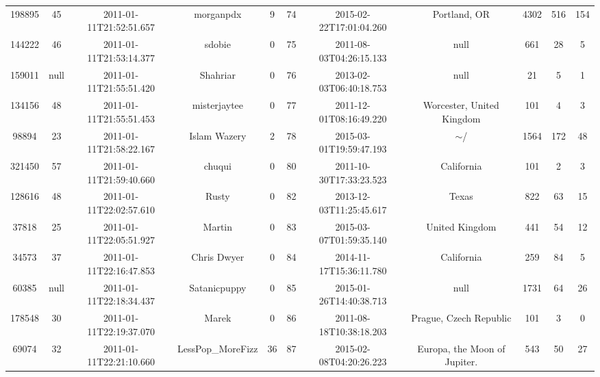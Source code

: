 \documentclass[12pt,a4paper,twoside,openright,titlepage,final]{article}
\begin{document}
\begin{landscape}
\begin{center}
\begin{longtable}{@{\extracolsep{\fill}}*{11}{c}}
			198895    & 45   & 2011-01-11T21:52:51.657 & morganpdx             & 9         & 74    & 2015-02-22T17:01:04.260 & Portland, OR                     & 4302       & 516     & 154   \\
			144222    & 46   & 2011-01-11T21:53:14.377 & sdobie                & 0         & 75    & 2011-08-03T04:26:15.133 & null                             & 661        & 28      & 5     \\
			159011    & null & 2011-01-11T21:55:51.420 & Shahriar              & 0         & 76    & 2013-02-03T06:40:18.753 & null                             & 21         & 5       & 1     \\
			134156    & 48   & 2011-01-11T21:55:51.453 & misterjaytee          & 0         & 77    & 2011-12-01T08:16:49.220 & Worcester, United Kingdom        & 101        & 4       & 3     \\
			98894     & 23   & 2011-01-11T21:58:22.167 & Islam Wazery          & 2         & 78    & 2015-03-01T19:59:47.193 & $\sim$/                          & 1564       & 172     & 48    \\
			321450    & 57   & 2011-01-11T21:59:40.660 & chuqui                & 0         & 80    & 2011-10-30T17:33:23.523 & California                       & 101        & 2       & 3     \\
			128616    & 48   & 2011-01-11T22:02:57.610 & Rusty                 & 0         & 82    & 2013-12-03T11:25:45.617 & Texas                            & 822        & 63      & 15    \\
			37818     & 25   & 2011-01-11T22:05:51.927 & Martin                & 0         & 83    & 2015-03-07T01:59:35.140 & United Kingdom                   & 441        & 54      & 12    \\
			34573     & 37   & 2011-01-11T22:16:47.853 & Chris Dwyer           & 0         & 84    & 2014-11-17T15:36:11.780 & California                       & 259        & 84      & 5     \\
			60385     & null & 2011-01-11T22:18:34.437 & Satanicpuppy          & 0         & 85    & 2015-01-26T14:40:38.713 & null                             & 1731       & 64      & 26    \\
			178548    & 30   & 2011-01-11T22:19:37.070 & Marek                 & 0         & 86    & 2011-08-18T10:38:18.203 & Prague, Czech Republic           & 101        & 3       & 0     \\
			69074     & 32   & 2011-01-11T22:21:10.660 & LessPop\_MoreFizz     & 36        & 87    & 2015-02-08T04:20:26.223 & Europa, the Moon of Jupiter.     & 543        & 50      & 27    \\

\end{longtable}
\end{center}
\end{landscape}
\end{document}
